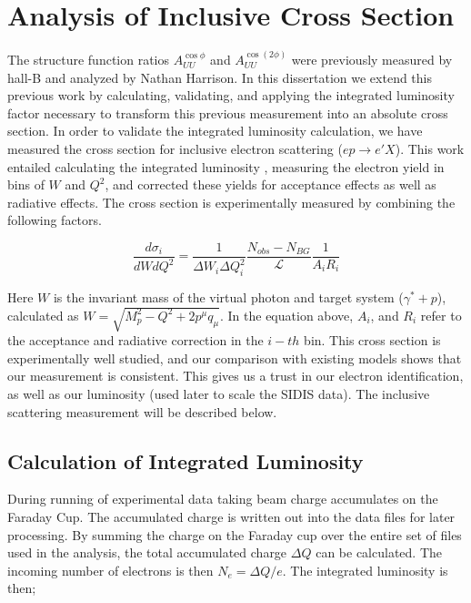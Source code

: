\section{Analysis of Inclusive Cross Section}

The structure function ratios $A_{UU}^{\cos\phi}$ and $A_{UU}^{\cos(2\phi)}$ were previously measured by hall-B and analyzed by Nathan Harrison.  In this dissertation we extend this previous work by calculating, validating, and applying the integrated luminosity factor necessary to transform this previous measurement into an absolute cross section.  In order to validate the integrated luminosity calculation, we have measured the cross section for inclusive electron scattering ($ep \rightarrow e'X$).  This work entailed calculating the integrated luminosity \cite{fcup-note}, measuring the electron yield in bins of $W$ and $Q^2$, and corrected these yields for acceptance effects as well as radiative effects.  The cross section is experimentally measured by combining the following factors. 

\begin{equation}
  \frac{d\sigma_i}{dW dQ^2} = \frac{1}{\Delta W_i \Delta Q^2_i} \frac{N_{obs} - N_{BG}}{\mathcal{L}} \frac{1}{A_i R_i}
\end{equation}

Here $W$ is the invariant mass of the virtual photon and target system ($\gamma^* + p$), calculated as $W = \sqrt{M_{p}^{2} - Q^2 + 2{p^\mu} q_{\mu}}$.  In the equation above, $A_i$, and $R_i$ refer to the acceptance and radiative correction in the $i-th$ bin.  This cross section is experimentally well studied, and our comparison with existing models shows that our measurement is consistent.  This gives us a trust in our electron identification, as well as our luminosity (used later to scale the SIDIS data).  The inclusive scattering measurement will be described below.

\subsection{Calculation of Integrated Luminosity}
During running of experimental data taking beam charge accumulates on the Faraday Cup.  The accumulated charge is written out into the data files for later processing.  By summing the charge on the Faraday cup over the entire set of files used in the analysis, the total accumulated charge $\Delta Q$ can be calculated.  The incoming number of electrons is then $N_e = \Delta Q/e $.  The integrated luminosity is then; 

